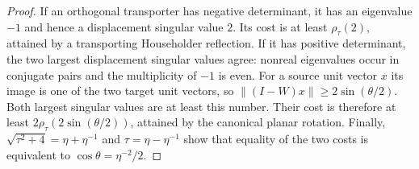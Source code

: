\begin{proof}
If an orthogonal transporter has negative determinant, it has an eigenvalue
$-1$ and hence a displacement singular value $2$. Its cost is at least
$\rho_\tau(2)$, attained by a transporting Householder reflection.
If it has positive determinant, the two largest displacement singular
values agree: nonreal eigenvalues occur in conjugate pairs and the
multiplicity of $-1$ is even. For a source unit vector $x$ its image is
one of the two target unit vectors, so $\|(I-W)x\|\geq2\sin(\theta/2)$.
Both largest singular values are at least this number. Their cost is
therefore at least $2\rho_\tau(2\sin(\theta/2))$, attained by the
canonical planar rotation. Finally,
$\sqrt{\tau^2+4}=\eta+\eta^{-1}$ and
$\tau=\eta-\eta^{-1}$ show that equality of the two costs is equivalent
to $\cos\theta=\eta^{-2}/2$.
\end{proof}
